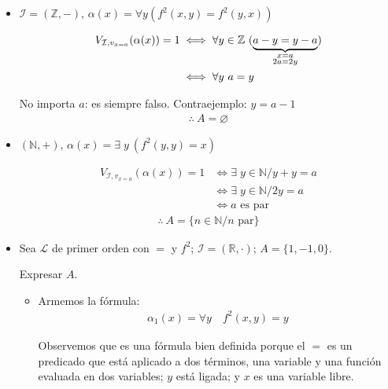     \begin{itemize}
        \item $\mathcal{I} = (\mathbb{Z}, -)$,
            $\alpha(x) = \forall y (f^2(x,y) = f^2(y,x))$

            \begin{align*}
                V_{\mathcal{I}, v_{x = a}}(\alpha(x)) = 1 
                &\iff
                \forall y \in \mathbb{Z} ~ (\underbrace{a - y = y - a}_{%
                \substack{x = a\\ 2a = 2y}}) \\
                &\iff \forall y ~ a = y
            \end{align*}

            No importa $a$: es siempre falso. Contraejemplo: $y = a - 1$
            \begin{gather*}
                \therefore ~ A = \varnothing
            \end{gather*}

        \item $\left(\mathbb{N}, +\right)$,
            $\alpha(x) = \exists \; y ~ (f^2(y,y) = x)$

            \begin{align*}
                V_{\mathcal{I}, v_{x=a}}(\alpha(x)) = 1
                &\iff \exists \; y \in \mathbb{N} / y + y = a\\
                &\iff \exists \; y \in \mathbb{N} / 2 y = a \\
                &\iff a \text{ es par}
            \end{align*}
            \begin{gather*}
                \therefore ~ A = \{ n \in \mathbb{N} / n \text{ par} \}
            \end{gather*}

        \item Sea $\mathcal{L}$ de primer orden con $=$ y $f^2$; 
            $\mathcal{I}=(\mathbb{R}, \cdot)$; $A = \{ 1, -1, 0 \}$.

            Expresar $A$.

            \begin{itemize}
            \item Armemos la fórmula:
            \begin{gather*}
                \alpha_1(x) = \forall y \quad f^2(x,y) = y
            \end{gather*}

            Observemos que es una fórmula bien definida porque el $=$ es un 
            predicado que está aplicado a dos términos, una variable y una 
            función evaluada en dos variables; $y$ está ligada; y $x$ es 
            una variable libre.


\end{itemize}
\end{itemize}
